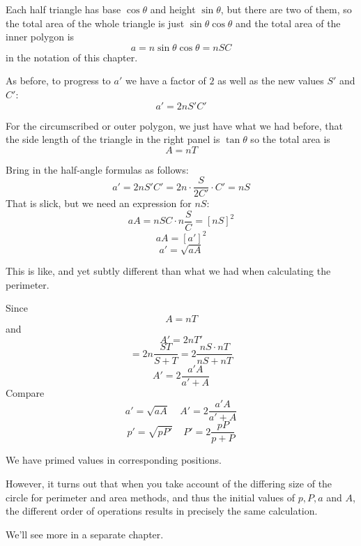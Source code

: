 \documentclass[11pt, oneside]{article}
\begin{document}
Each half triangle has base $\cos \theta$ and height $\sin \theta$, but there are two of them, so the total area of the whole triangle is just $\sin \theta \cos \theta$ and the total area of the inner polygon is
\[ a = n \sin \theta \cos \theta = n SC \]
in the notation of this chapter.  

As before, to progress to $a'$ we have a factor of $2$ as well as the new values $S'$ and $C'$:
\[ a' = 2n S'C' \]

For the circumscribed or outer polygon, we just have what we had before, that the side length of the triangle in the right panel is $\tan \theta$ so the total area is
\[ A = nT \]

Bring in the half-angle formulas as follows:
\[ a' = 2n S'C' = 2n \cdot \frac{S}{2C'} \cdot C' = nS \]
That is slick, but we need an expression for $nS$:
\[ aA = nSC \cdot n \frac{S}{C} = [nS]^2 \]
\[ aA = [a']^2 \]
\[ a' = \sqrt{aA} \]

This is like, and yet subtly different than what we had when calculating the perimeter.

Since
\[ A = nT \]
and
\[ A' = 2nT' \]
\[ = 2n \frac{ST}{S + T} = 2 \frac{nS \cdot nT}{nS + nT} \]
\[ A' = 2 \frac{a'A}{a' + A} \]
Compare
\[ a' = \sqrt{aA}  \ \ \ \ \  A' = 2 \frac{a'A}{a' + A} \]
\[ p' = \sqrt{pP'}  \ \ \ \ \   P' = 2 \frac{pP}{p + P} \]

We have primed values in corresponding positions.

However, it turns out that when you take account of the differing size of the circle for perimeter and area methods, and thus the initial values of $p,P,a$ and $A$, the different order of operations results in precisely the same calculation.

We'll see more in a separate chapter.
\end{document}
